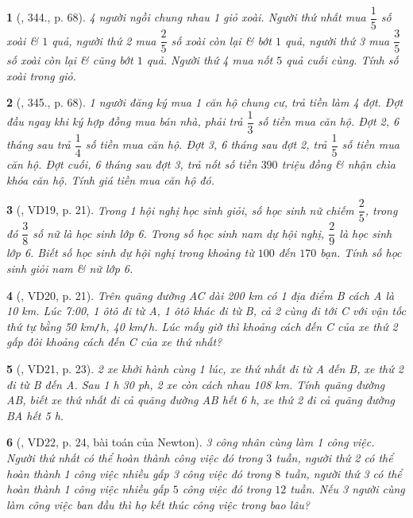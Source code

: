 \documentclass{article}
\newtheorem{baitoan}{}
\begin{document}
\begin{baitoan}[\cite{Tuyen_Toan_6}, 344., p. 68]
	4 người ngồi chung nhau 1 giỏ xoài. Người thứ nhất mua $\dfrac{1}{5}$ số xoài \& $1$ quả, người thứ 2 mua $\dfrac{2}{5}$ số xoài còn lại \& bớt $1$ quả, người thứ 3 mua $\dfrac{3}{5}$ số xoài còn lại \& cũng bớt $1$ quả. Người thứ 4 mua nốt $5$ quả cuối cùng. Tính số xoài trong giỏ.
\end{baitoan}

\begin{baitoan}[\cite{Tuyen_Toan_6}, 345., p. 68]
	1 người đăng ký mua 1 căn hộ chung cư, trả tiền làm 4 đợt. Đợt đầu ngay khi ký hợp đồng mua bán nhà, phải trả $\dfrac{1}{3}$ số tiền mua căn hộ. Đợt 2, 6 tháng sau trả $\dfrac{1}{4}$ số tiền mua căn hộ. Đợt 3, 6 tháng sau đợt 2, trả $\dfrac{1}{5}$ số tiền mua căn hộ. Đợt cuối, 6 tháng sau đợt 3, trả nốt số tiền $390$ triệu đồng \& nhận chìa khóa căn hộ. Tính giá tiền mua căn hộ đó.
\end{baitoan}

\begin{baitoan}[\cite{Binh_Toan_6_tap_2}, VD19, p. 21]
	Trong 1 hội nghị học sinh giỏi, số học sinh nữ chiếm $\dfrac{2}{5}$, trong đó $\dfrac{3}{8}$ số nữ là học sinh lớp 6. Trong số học sinh nam dự hội nghị, $\dfrac{2}{9}$ là học sinh lớp 6. Biết số học sinh dự hội nghị trong khoảng từ $100$ đến $170$ bạn. Tính số học sinh giỏi nam \& nữ lớp 6.
\end{baitoan}

\begin{baitoan}[\cite{Binh_Toan_6_tap_2}, VD20, p. 21]
	Trên quãng đường AC dài {\rm200 km} có 1 địa điểm B cách A là {\rm10 km}. Lúc {\rm7:00}, 1 ôtô đi từ A, 1 ôtô khác đi từ B, cả 2 cùng đi tới C với vận tốc thứ tự bằng {\rm50 km{\tt/}h, 40 km{\tt/}h}. Lúc mấy giờ thì khoảng cách đến C của xe thứ 2 gấp đôi khoảng cách đến C của xe thứ nhất?
\end{baitoan}

\begin{baitoan}[\cite{Binh_Toan_6_tap_2}, VD21, p. 23]
	2 xe khởi hành cùng 1 lúc, xe thứ nhất đi từ A đến B, xe thứ 2 đi từ B đến A. Sau {\rm1 h 30 ph}, 2 xe còn cách nhau {\rm108 km}. Tính quãng đường AB, biết xe thứ nhất đi cả quãng đường AB hết {\rm6 h}, xe thứ 2 đi cả quãng đường BA hết {\rm5 h}.
\end{baitoan}

\begin{baitoan}[\cite{Binh_Toan_6_tap_2}, VD22, p. 24, bài toán của Newton]
	3 công nhân cùng làm 1 công việc. Người thứ nhất có thể hoàn thành công việc đó trong $3$ tuần, người thứ 2 có thể hoàn thành 1 công việc nhiều gấp 3 công việc đó trong $8$ tuần, người thứ 3 có thể hoàn thành 1 công việc nhiều gấp $5$ công việc đó trong $12$ tuần. Nếu 3 người cùng làm công việc ban đầu thì họ kết thúc công việc trong bao lâu?
\end{baitoan}
\end{document}
